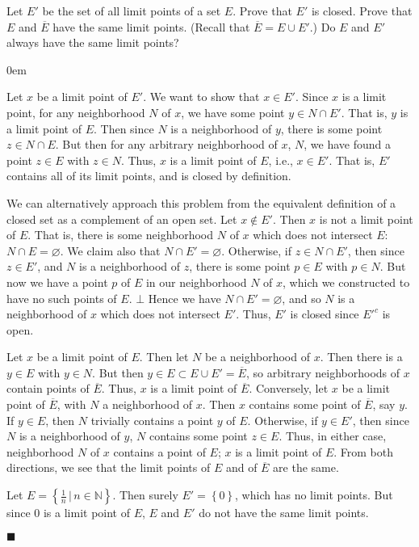 \documentclass[12pt]{article}
\renewcommand{\qed}{\hfill$\blacksquare$}
\renewenvironment{proof}{\begin{addmargin}[1em]{0em}\begin{newproof}}{\end{newproof}\end{addmargin}\qed}
\newenvironment{problem}[2][Exercise]{\begin{trivlist}
\item[\hskip \labelsep {\bfseries #1}\hskip \labelsep {\bfseries #2.}]}{\end{trivlist}}
\begin{document}
\begin{problem}{2.6}
Let $E'$ be the set of all limit points of a set $E$. Prove that $E'$ is closed. Prove that $E$ and $\overline{E}$ have the same limit points. (Recall that $\overline{E}=E\cup E'$.) Do $E$ and $E'$ always have the same limit points?
\end{problem}
\begin{proof}
Let $x$ be a limit point of $E'$. We want to show that $x \in E'$. Since $x$ is a limit point, for any neighborhood $N$ of $x$, we have some point $y \in N\cap E'$. That is, $y$ is a limit point of $E$. Then since $N$ is a neighborhood of $y$, there is some point $z \in N\cap E$. But then for any arbitrary neighborhood of $x$, $N$, we have found a point $z \in E$ with $z \in N$. Thus, $x$ is a limit point of $E$, i.e., $x\in E'$. That is, $E'$ contains all of its limit points, and is closed by definition.

{\color{red} We can alternatively approach this problem from the equivalent definition of a closed set as a complement of an open set. Let $x\notin E'$. Then $x$ is not a limit point of $E$. That is, there is some neighborhood $N$ of $x$ which does not intersect $E$: $N\cap E = \varnothing$. We claim also that $N\cap E' = \varnothing$. Otherwise, if $z \in N \cap E'$, then since $z \in E'$, and $N$ is a neighborhood of $z$, there is some point $p \in E$ with $p \in N$. But now we have a point $p$ of $E$ in our neighborhood $N$ of $x$, which we constructed to have no such points of $E$. $\bot$ Hence we have $N\cap E' = \varnothing$, and so $N$ is a neighborhood of $x$ which does not intersect $E'$. Thus, $E'$ is closed since $E'^c$ is open.}

Let $x$ be a limit point of $E$. Then let $N$ be a neighborhood of $x$. Then there is a $y\in E$ with $y\in N$. But then $y \in E \subset E\cup E' = \overline{E}$, so arbitrary neighborhoods of $x$ contain points of $\overline{E}$. Thus, $x$ is a limit point of $\overline{E}$. Conversely, let $x$ be a limit point of $\overline{E}$, with $N$ a neighborhood of $x$. Then $x$ contains some point of $\overline{E}$, say $y$. If $y\in E$, then $N$ trivially contains a point $y$ of $E$. Otherwise, if $y \in E'$, then since $N$ is a neighborhood of $y$, $N$ contains some point $z \in E$. Thus, in either case, neighborhood $N$ of $x$ contains a point of $E$; $x$ is a limit point of $E$. From both directions, we see that the limit points of $E$ and of $\overline{E}$ are the same.

Let $E = \left\{ \frac{1}{n} \, | \, n\in \mathbb{N} \right\}$. Then surely $E' = \left\{0\right\}$, which has no limit points. But since $0$ is a limit point of $E$, $E$ and $E'$ do not have the same limit points.
\end{proof}
\end{document}
